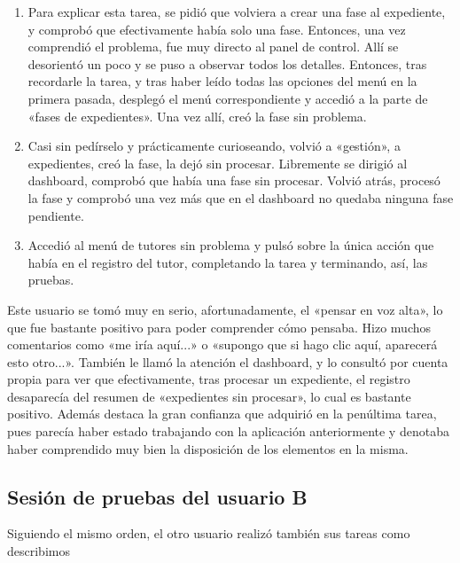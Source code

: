 \begin{enumerate}
	\item Para explicar esta tarea, se pidió que volviera a crear una fase al expediente, y comprobó que efectivamente había solo una fase. Entonces, una vez comprendió el problema, fue muy directo al panel de control. Allí se desorientó un poco y se puso a observar todos los detalles. Entonces, tras recordarle la tarea, y tras haber leído todas las opciones del menú en la primera pasada, desplegó el menú correspondiente y accedió a la parte de «fases de expedientes». Una vez allí, creó la fase sin problema.
	\item Casi sin pedírselo y prácticamente curioseando, volvió a «gestión», a expedientes, creó la fase, la dejó sin procesar. Libremente se dirigió al dashboard, comprobó que había una fase sin procesar. Volvió atrás, procesó la fase y comprobó una vez más que en el dashboard no quedaba ninguna fase pendiente.
	\item Accedió al menú de tutores sin problema y pulsó sobre la única acción que había en el registro del tutor, completando la tarea y terminando, así, las pruebas.
\end{enumerate}

Este usuario se tomó muy en serio, afortunadamente, el «pensar en voz alta», lo que fue bastante positivo para poder comprender cómo pensaba. Hizo muchos comentarios como «me iría aquí...» o «supongo que si hago clic aquí, aparecerá esto otro...». También le llamó la atención el dashboard, y lo consultó por cuenta propia para ver que efectivamente, tras procesar un expediente, el registro desaparecía del resumen de «expedientes sin procesar», lo cual es bastante positivo. Además destaca la gran confianza que adquirió en la penúltima tarea, pues parecía haber estado trabajando con la aplicación anteriormente y denotaba haber comprendido muy bien la disposición de los elementos en la misma.

\subsection{Sesión de pruebas del usuario B}


Siguiendo el mismo orden, el otro usuario realizó también sus tareas como describimos

